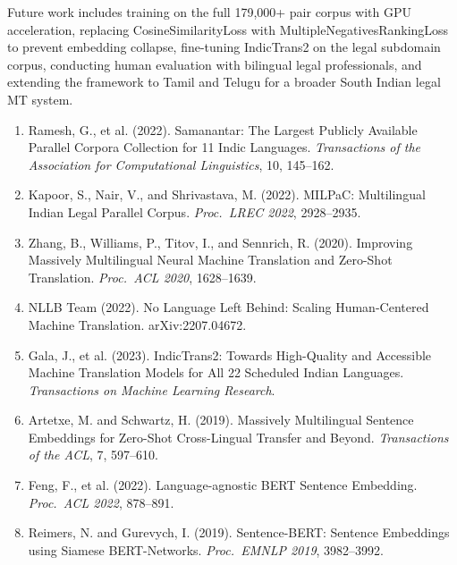 \documentclass[conference,letterpaper]{IEEEtran}
\begin{document}
Future work includes training on the full 179,000+ pair corpus with GPU
acceleration, replacing CosineSimilarityLoss with
MultipleNegativesRankingLoss to prevent embedding collapse, fine-tuning
IndicTrans2 on the legal subdomain corpus, conducting human evaluation
with bilingual legal professionals, and extending the framework to Tamil
and Telugu for a broader South Indian legal MT system.




\begin{enumerate}
    \item Ramesh, G., et al. (2022). Samanantar: The Largest Publicly Available
    Parallel Corpora Collection for 11 Indic Languages.
    \textit{Transactions of the Association for Computational Linguistics}, 10, 145--162.

    \item Kapoor, S., Nair, V., and Shrivastava, M. (2022). MILPaC: Multilingual
    Indian Legal Parallel Corpus. \textit{Proc.\ LREC 2022}, 2928--2935.

    \item Zhang, B., Williams, P., Titov, I., and Sennrich, R. (2020). Improving
    Massively Multilingual Neural Machine Translation and Zero-Shot Translation.
    \textit{Proc.\ ACL 2020}, 1628--1639.

    \item NLLB Team (2022). No Language Left Behind: Scaling Human-Centered
    Machine Translation. arXiv:2207.04672.

    \item Gala, J., et al. (2023). IndicTrans2: Towards High-Quality and
    Accessible Machine Translation Models for All 22 Scheduled Indian Languages.
    \textit{Transactions on Machine Learning Research}.

    \item Artetxe, M. and Schwartz, H. (2019). Massively Multilingual Sentence
    Embeddings for Zero-Shot Cross-Lingual Transfer and Beyond.
    \textit{Transactions of the ACL}, 7, 597--610.

    \item Feng, F., et al. (2022). Language-agnostic BERT Sentence Embedding.
    \textit{Proc.\ ACL 2022}, 878--891.

    \item Reimers, N. and Gurevych, I. (2019). Sentence-BERT: Sentence
    Embeddings using Siamese BERT-Networks. \textit{Proc.\ EMNLP 2019},
    3982--3992.


\end{enumerate}
\end{document}
